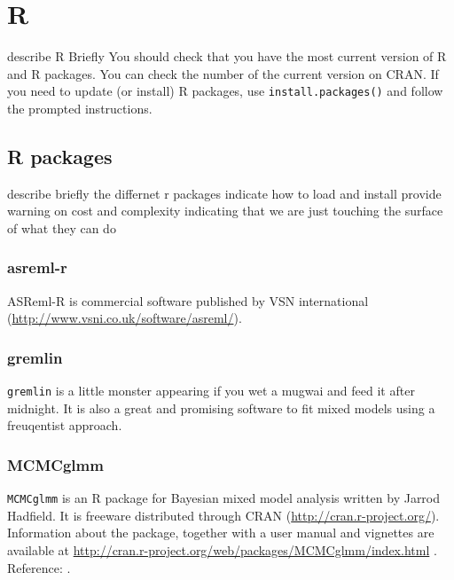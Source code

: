 \documentclass[12pt,]{book}
\begin{document}
\hypertarget{r}{%
\section{R}\label{r}}

describe R Briefly
You should check that you have the most current version of R and R packages. You can check the number of the current version on CRAN. If you need to update (or install) R packages, use \texttt{install.packages()} and follow the prompted instructions.

\hypertarget{r-packages}{%
\subsection{R packages}\label{r-packages}}

describe briefly the differnet r packages indicate how to load and install provide warning on cost and complexity indicating that we are just touching the surface of what they can do

\hypertarget{asreml-r}{%
\subsubsection{asreml-r}\label{asreml-r}}

ASReml-R is commercial software published by VSN international (\url{http://www.vsni.co.uk/software/asreml/}).

\hypertarget{gremlin}{%
\subsubsection{gremlin}\label{gremlin}}

\texttt{gremlin} is a little monster appearing if you wet a mugwai and feed it after midnight. It is also a great and promising software to fit mixed models using a freuqentist approach.

\hypertarget{mcmcglmm}{%
\subsubsection{MCMCglmm}\label{mcmcglmm}}

\texttt{MCMCglmm} is an R package for Bayesian mixed model analysis written by Jarrod Hadfield. It is
freeware distributed through CRAN (\url{http://cran.r-project.org/}). Information about the package, together
with a user manual and vignettes are available at \url{http://cran.r-project.org/web/packages/MCMCglmm/index.html} .
Reference: \citep[\citet{R-MCMCglmm}]{MCMCglmm2010}.
\end{document}
